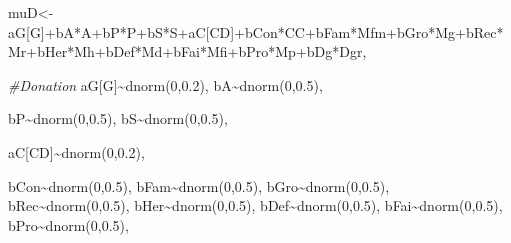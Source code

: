 \documentclass[
]{book}
\newenvironment{Shaded}{\begin{snugshade}}{\end{snugshade}}
\newcommand{\CommentTok}[1]{\textcolor[rgb]{0.56,0.35,0.01}{\textit{#1}}}
\newcommand{\DecValTok}[1]{\textcolor[rgb]{0.00,0.00,0.81}{#1}}
\newcommand{\FloatTok}[1]{\textcolor[rgb]{0.00,0.00,0.81}{#1}}
\newcommand{\FunctionTok}[1]{\textcolor[rgb]{0.00,0.00,0.00}{#1}}
\newcommand{\NormalTok}[1]{#1}
\newcommand{\OtherTok}[1]{\textcolor[rgb]{0.56,0.35,0.01}{#1}}
\newcommand{\SpecialCharTok}[1]{\textcolor[rgb]{0.00,0.00,0.00}{#1}}
\begin{document}
\begin{Shaded}
\begin{Highlighting}[]
\NormalTok{    muD}\OtherTok{\textless{}{-}}\NormalTok{aG[G]}\SpecialCharTok{+}\NormalTok{bA}\SpecialCharTok{*}\NormalTok{A}\SpecialCharTok{+}\NormalTok{bP}\SpecialCharTok{*}\NormalTok{P}\SpecialCharTok{+}\NormalTok{bS}\SpecialCharTok{*}\NormalTok{S}\SpecialCharTok{+}\NormalTok{aC[CD]}\SpecialCharTok{+}\NormalTok{bCon}\SpecialCharTok{*}\NormalTok{CC}\SpecialCharTok{+}\NormalTok{bFam}\SpecialCharTok{*}\NormalTok{Mfm}\SpecialCharTok{+}\NormalTok{bGro}\SpecialCharTok{*}\NormalTok{Mg}\SpecialCharTok{+}\NormalTok{bRec}\SpecialCharTok{*}\NormalTok{Mr}\SpecialCharTok{+}\NormalTok{bHer}\SpecialCharTok{*}\NormalTok{Mh}\SpecialCharTok{+}\NormalTok{bDef}\SpecialCharTok{*}\NormalTok{Md}\SpecialCharTok{+}\NormalTok{bFai}\SpecialCharTok{*}\NormalTok{Mfi}\SpecialCharTok{+}\NormalTok{bPro}\SpecialCharTok{*}\NormalTok{Mp}\SpecialCharTok{+}\NormalTok{bDg}\SpecialCharTok{*}\NormalTok{Dgr,}
    
    \CommentTok{\#Donation}
\NormalTok{    aG[G]}\SpecialCharTok{\textasciitilde{}}\FunctionTok{dnorm}\NormalTok{(}\DecValTok{0}\NormalTok{,}\FloatTok{0.2}\NormalTok{),}
\NormalTok{    bA}\SpecialCharTok{\textasciitilde{}}\FunctionTok{dnorm}\NormalTok{(}\DecValTok{0}\NormalTok{,}\FloatTok{0.5}\NormalTok{),}
    
\NormalTok{    bP}\SpecialCharTok{\textasciitilde{}}\FunctionTok{dnorm}\NormalTok{(}\DecValTok{0}\NormalTok{,}\FloatTok{0.5}\NormalTok{),}
\NormalTok{    bS}\SpecialCharTok{\textasciitilde{}}\FunctionTok{dnorm}\NormalTok{(}\DecValTok{0}\NormalTok{,}\FloatTok{0.5}\NormalTok{),}
    
\NormalTok{    aC[CD]}\SpecialCharTok{\textasciitilde{}}\FunctionTok{dnorm}\NormalTok{(}\DecValTok{0}\NormalTok{,}\FloatTok{0.2}\NormalTok{),}
    
\NormalTok{    bCon}\SpecialCharTok{\textasciitilde{}}\FunctionTok{dnorm}\NormalTok{(}\DecValTok{0}\NormalTok{,}\FloatTok{0.5}\NormalTok{),}
\NormalTok{    bFam}\SpecialCharTok{\textasciitilde{}}\FunctionTok{dnorm}\NormalTok{(}\DecValTok{0}\NormalTok{,}\FloatTok{0.5}\NormalTok{),}
\NormalTok{    bGro}\SpecialCharTok{\textasciitilde{}}\FunctionTok{dnorm}\NormalTok{(}\DecValTok{0}\NormalTok{,}\FloatTok{0.5}\NormalTok{),}
\NormalTok{    bRec}\SpecialCharTok{\textasciitilde{}}\FunctionTok{dnorm}\NormalTok{(}\DecValTok{0}\NormalTok{,}\FloatTok{0.5}\NormalTok{),}
\NormalTok{    bHer}\SpecialCharTok{\textasciitilde{}}\FunctionTok{dnorm}\NormalTok{(}\DecValTok{0}\NormalTok{,}\FloatTok{0.5}\NormalTok{),}
\NormalTok{    bDef}\SpecialCharTok{\textasciitilde{}}\FunctionTok{dnorm}\NormalTok{(}\DecValTok{0}\NormalTok{,}\FloatTok{0.5}\NormalTok{),}
\NormalTok{    bFai}\SpecialCharTok{\textasciitilde{}}\FunctionTok{dnorm}\NormalTok{(}\DecValTok{0}\NormalTok{,}\FloatTok{0.5}\NormalTok{),}
\NormalTok{    bPro}\SpecialCharTok{\textasciitilde{}}\FunctionTok{dnorm}\NormalTok{(}\DecValTok{0}\NormalTok{,}\FloatTok{0.5}\NormalTok{),}
    

\end{Highlighting}
\end{Shaded}
\end{document}
